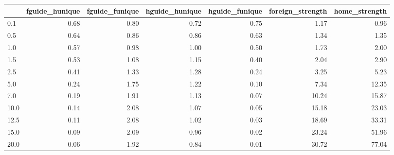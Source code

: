 \begin{tabular}{lrrrrrr}
\toprule
 & fguide_hunique & fguide_funique & hguide_hunique & hguide_funique & foreign_strength & home_strength \\
\midrule
0.1 & 0.68 & 0.80 & 0.72 & 0.75 & 1.17 & 0.96 \\
0.5 & 0.64 & 0.86 & 0.86 & 0.63 & 1.34 & 1.35 \\
1.0 & 0.57 & 0.98 & 1.00 & 0.50 & 1.73 & 2.00 \\
1.5 & 0.53 & 1.08 & 1.15 & 0.40 & 2.04 & 2.90 \\
2.5 & 0.41 & 1.33 & 1.28 & 0.24 & 3.25 & 5.23 \\
5.0 & 0.24 & 1.75 & 1.22 & 0.10 & 7.34 & 12.35 \\
7.0 & 0.19 & 1.91 & 1.13 & 0.07 & 10.24 & 15.87 \\
10.0 & 0.14 & 2.08 & 1.07 & 0.05 & 15.18 & 23.03 \\
12.5 & 0.11 & 2.08 & 1.02 & 0.03 & 18.69 & 33.31 \\
15.0 & 0.09 & 2.09 & 0.96 & 0.02 & 23.24 & 51.96 \\
20.0 & 0.06 & 1.92 & 0.84 & 0.01 & 30.72 & 77.04 \\
\bottomrule
\end{tabular}
